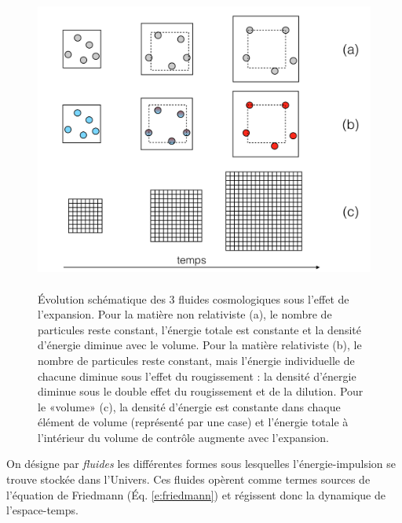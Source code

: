 \begin{figure}[htbp]
	\centering
		\includegraphics[height=10cm]{figs/fluides.png}
	\caption[Évolution des fluides cosmologiques]{Évolution schématique des 3 fluides cosmologiques sous l'effet de l'expansion. Pour la matière non relativiste (a), le nombre de particules reste constant, l'énergie totale est constante et la densité d'énergie diminue avec le volume. Pour la matière relativiste (b), le nombre de particules reste constant, mais l'énergie individuelle de chacune diminue sous l'effet du rougissement : la densité d'énergie diminue sous le double effet du rougissement et de la dilution. Pour le «volume» (c), la densité d'énergie est constante dans chaque élément de volume (représenté par une case) et l'énergie totale à l'intérieur du volume de contrôle augmente avec l'expansion.}
	\label{f:fluides}
\end{figure}

On désigne par \textit{fluides} les différentes formes sous lesquelles l'énergie-impulsion se trouve stockée dans l'Univers. Ces fluides opèrent comme termes  sources de l'équation de Friedmann (Éq. \ref{e:friedmann}) et régissent donc la dynamique de l'espace-temps. 

